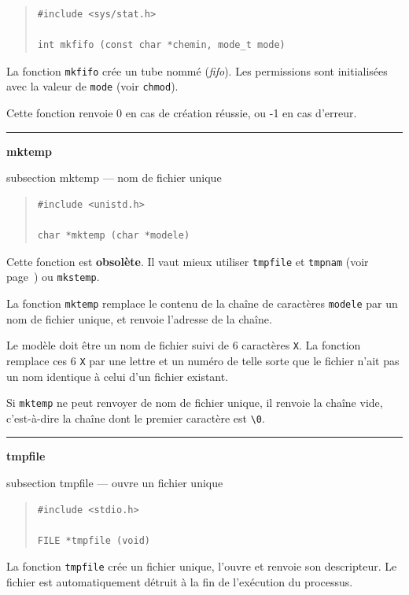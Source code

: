 \documentclass [twoside] {report}
\newcommand {\primitive} [1]
    {
	\phantomsection
	{\large \textbf {#1}}
	\addcontentsline {toc} {subsection} {#1}
    }
\newcommand {\separation}
    {
	\vspace {5mm}
	\nopagebreak
	\hrule
    }
\begin{document}
\begin {quote}
\begin {verbatim}
#include <sys/stat.h>

int mkfifo (const char *chemin, mode_t mode)
\end{verbatim}
\end {quote}

La fonction \texttt {mkfifo} crée un tube nommé (\emph {fifo}).
Les permissions sont initialisées avec la valeur de \texttt {mode}
(voir \texttt {chmod}).

Cette fonction renvoie 0 en cas de création
réussie, ou -1 en cas d'erreur.




\separation 
\primitive {mktemp} --- nom de fichier unique

\begin {quote}
\begin {verbatim}
#include <unistd.h>

char *mktemp (char *modele)
\end{verbatim}
\end {quote}

Cette fonction est \textbf {obsolète}. Il vaut mieux utiliser
\texttt{tmpfile} et \texttt{tmpnam} (voir page~\pageref {tmpfile})
ou \texttt{mkstemp}.

La fonction \texttt {mktemp} remplace le contenu de la chaîne de
caractères \texttt {modele} par un nom de fichier unique, et
renvoie l'adresse de la chaîne.

Le modèle doit être un nom de fichier suivi de 6 caractères
\texttt {X}. La fonction remplace ces 6 \texttt {X} par une lettre et un
numéro de telle sorte que le fichier n'ait pas un nom
identique à celui d'un fichier existant.

Si \texttt {mktemp} ne peut renvoyer de nom de fichier unique, il
renvoie la chaîne vide, c'est-à-dire la chaîne dont le
premier caractère est \verb:\0:.



\separation 
\primitive {tmpfile} --- ouvre un fichier unique
    \label {tmpfile}

\begin {quote}
\begin {verbatim}
#include <stdio.h>

FILE *tmpfile (void)
\end{verbatim}
\end {quote}

La fonction \texttt {tmpfile} crée un fichier unique, l'ouvre et renvoie son
descripteur. Le fichier est automatiquement détruit à la fin de
l'exécution du processus.
\end{document}
